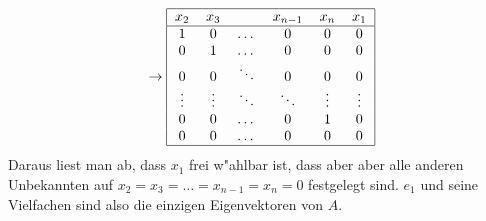 \begin{loesung}
\[\begin{tabular}{|cccccc|}
\hline
\end{tabular}
\rightarrow
\begin{tabular}{|cccccc|}
\hline
$x_2$&$x_3$&&$x_{n-1}$&$x_n$&$x_1$\\
\hline
1       &0       &$ \dots$&0       &0       &0        \\
0       &1       &$ \dots$&0       &0       &0        \\
0       &0       &$\ddots$&0       &0       &0        \\
$\vdots$&$\vdots$&$\ddots$&$\ddots$&$\vdots$&$\vdots$ \\
0       &0       &$ \dots$&0       &1       &0        \\
0       &0       &$ \dots$&0       &0       &0        \\
\hline
\end{tabular}
\]
Daraus liest man ab, dass $x_1$ frei w"ahlbar ist, dass aber
aber alle anderen Unbekannten auf $x_2=x_3=\dots=x_{n-1}=x_n=0$
festgelegt sind. $e_1$ und seine Vielfachen sind also die einzigen
Eigenvektoren von $A$.
\end{loesung}

